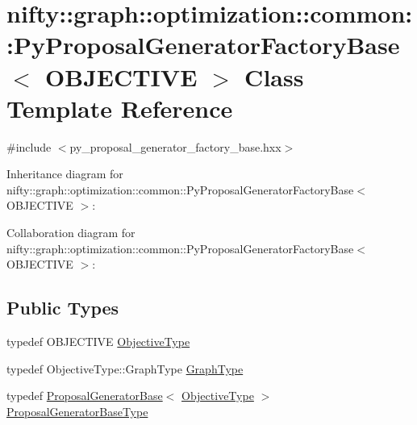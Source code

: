 \hypertarget{classnifty_1_1graph_1_1optimization_1_1common_1_1PyProposalGeneratorFactoryBase}{}\section{nifty\+:\+:graph\+:\+:optimization\+:\+:common\+:\+:Py\+Proposal\+Generator\+Factory\+Base$<$ O\+B\+J\+E\+C\+T\+I\+V\+E $>$ Class Template Reference}
\label{classnifty_1_1graph_1_1optimization_1_1common_1_1PyProposalGeneratorFactoryBase}


{\ttfamily \#include $<$py\+\_\+proposal\+\_\+generator\+\_\+factory\+\_\+base.\+hxx$>$}



Inheritance diagram for nifty\+:\+:graph\+:\+:optimization\+:\+:common\+:\+:Py\+Proposal\+Generator\+Factory\+Base$<$ O\+B\+J\+E\+C\+T\+I\+V\+E $>$\+:


Collaboration diagram for nifty\+:\+:graph\+:\+:optimization\+:\+:common\+:\+:Py\+Proposal\+Generator\+Factory\+Base$<$ O\+B\+J\+E\+C\+T\+I\+V\+E $>$\+:
\subsection*{Public Types}
\begin{DoxyCompactItemize}
\item 
typedef O\+B\+J\+E\+C\+T\+I\+V\+E \hyperlink{classnifty_1_1graph_1_1optimization_1_1common_1_1PyProposalGeneratorFactoryBase_a9449da0812d19e05891bdf7ec4fd58d4}{Objective\+Type}
\item 
typedef Objective\+Type\+::\+Graph\+Type \hyperlink{classnifty_1_1graph_1_1optimization_1_1common_1_1PyProposalGeneratorFactoryBase_a68150bf24a62de0fb75d6360841d8a1b}{Graph\+Type}
\item 
typedef \hyperlink{classnifty_1_1graph_1_1optimization_1_1common_1_1ProposalGeneratorBase}{Proposal\+Generator\+Base}$<$ \hyperlink{classnifty_1_1graph_1_1optimization_1_1common_1_1ProposalGeneratorFactoryBase_aa5736d89b93a428099cc2f867266c8c7}{Objective\+Type} $>$ \hyperlink{classnifty_1_1graph_1_1optimization_1_1common_1_1PyProposalGeneratorFactoryBase_a7cd8e337619fd5f5c42c797867af0e91}{Proposal\+Generator\+Base\+Type}
\end{DoxyCompactItemize}
